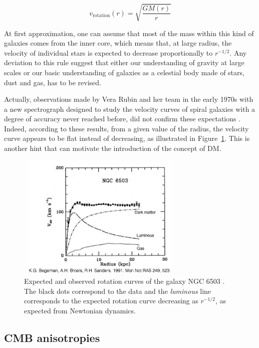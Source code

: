 \documentclass[a4paper, 10pt, openright]{report}
\begin{document}
\begin{equation} \label{equation:RotationVelocity}
v_{\text{rotation}}(r) = \sqrt{\frac{G M(r)}{r}}
\end{equation}

At first approximation, one can assume that most of the mass within this kind of galaxies comes from the inner core, which means that, at large radius, the velocity of individual stars is expected to decrease proportionally to $r^{-1/2}$. Any deviation to this rule suggest that either our understanding of gravity at large scales or our basic understanding of galaxies as a celestial body made of stars, dust and gas, has to be revised.

Actually, observations made by Vera Rubin and her team in the early 1970s with a new spectrograph designed to study the velocity curves of spiral galaxies with a degree of accuracy never reached before, did not confirm these expectations \cite{VeraRubin}. Indeed, according to these results, from a given value of the radius, the velocity curve appears to be flat instead of decreasing, as illustrated in Figure~\ref{figure:RotationCurves}. This is another hint that can motivate the introduction of the concept of \ac{DM}.

\begin{figure}[htbp]
\begin{center}
\includegraphics[width=8cm, height=6cm]{figs/RotationCurve.jpeg}
\caption{Expected and observed rotation curves of the galaxy NGC 6503 \cite{RotationCurves}. The black dots correspond to the data and the \textit{luminous} line corresponds to the expected rotation curve decreasing as $r^{-1/2}$, as expected from Newtonian dynamics.}
\label{figure:RotationCurves}
\end{center}
\end{figure}

\vspace{-10pt}
\subsection{\acf{CMB} anisotropies} \label{subsection:CMB}
\end{document}
